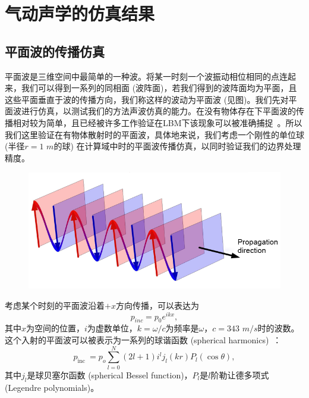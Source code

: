 \section{气动声学的仿真结果}
\subsection{平面波的传播仿真}
平面波是三维空间中最简单的一种波。将某一时刻一个波振动相位相同的点连起来，我们可以得到一系列的同相面 (波阵面)，若我们得到的波阵面均为平面，且这些平面垂直于波的传播方向，我们称这样的波动为平面波 (见图)。我们先对平面波进行仿真，以测试我们的方法声波仿真的能力。在没有物体存在下平面波的传播相对较为简单，且已经被许多工作验证在LBM下该现象可以被准确捕捉~\cite{doi:10.2514/6.2009-3395, viggen2009lattice}。所以我们这里验证在有物体散射时的平面波，具体地来说，我们考虑一个刚性的单位球 (半径$r=1$ $m$的球) 在计算域中时的平面波传播仿真，以同时验证我们的边界处理精度。

\begin{figure}[!htbp]
  \centering
    \includegraphics[width=0.7\columnwidth]{figures/plane_wave.png}
  \label{img:plane_wave}
\end{figure}

考虑某个时刻的平面波沿着$+x$方向传播，可以表达为
\begin{equation}
  p_{inc}=p_0 e^{ikx},
\end{equation}
其中$x$为空间的位置，$i$为虚数单位，$k=\omega/c$为频率是$\omega$，$c=343$ $m/s$时的波数。这个入射的平面波可以被表示为一系列的球谐函数 (spherical harmonics)~\cite{rayleigh1896theory}：
\begin{equation}
  p_{\text {inc }}=p_{o} \sum_{l=0}^{N}(2 l+1) i^{l} j_{l}(k r) P_{l}(\cos \theta),
\end{equation}
其中$j_{l}$是球贝塞尔函数 (spherical Bessel function)，$P_{l}$是$l$阶勒让德多项式 (Legendre polynomials)。

